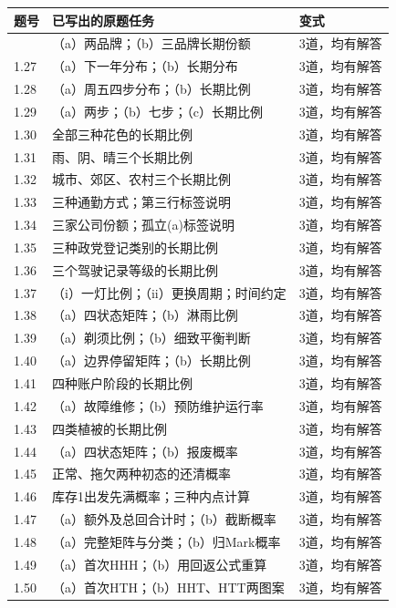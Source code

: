 \documentclass[
  11pt,
  a4paper,
  UTF8,
  fontset=fandol]{ctexart}
\begin{document}
\begin{longtable}[]{@{}lll@{}}
\toprule\noalign{}
题号 & 已写出的原题任务 & 变式 \\
\midrule\noalign{}
\endhead
\bottomrule\noalign{}
\endlastfoot
1.26 & （a）两品牌；（b）三品牌长期份额 & 3道，均有解答 \\
1.27 & （a）下一年分布；（b）长期分布 & 3道，均有解答 \\
1.28 & （a）周五四步分布；（b）长期比例 & 3道，均有解答 \\
1.29 & （a）两步；（b）七步；（c）长期比例 & 3道，均有解答 \\
1.30 & 全部三种花色的长期比例 & 3道，均有解答 \\
1.31 & 雨、阴、晴三个长期比例 & 3道，均有解答 \\
1.32 & 城市、郊区、农村三个长期比例 & 3道，均有解答 \\
1.33 & 三种通勤方式；第三行标签说明 & 3道，均有解答 \\
1.34 & 三家公司份额；孤立(a)标签说明 & 3道，均有解答 \\
1.35 & 三种政党登记类别的长期比例 & 3道，均有解答 \\
1.36 & 三个驾驶记录等级的长期比例 & 3道，均有解答 \\
1.37 & （i）一灯比例；（ii）更换周期；时间约定 & 3道，均有解答 \\
1.38 & （a）四状态矩阵；（b）淋雨比例 & 3道，均有解答 \\
1.39 & （a）剃须比例；（b）细致平衡判断 & 3道，均有解答 \\
1.40 & （a）边界停留矩阵；（b）长期比例 & 3道，均有解答 \\
1.41 & 四种账户阶段的长期比例 & 3道，均有解答 \\
1.42 & （a）故障维修；（b）预防维护运行率 & 3道，均有解答 \\
1.43 & 四类植被的长期比例 & 3道，均有解答 \\
1.44 & （a）四状态矩阵；（b）报废概率 & 3道，均有解答 \\
1.45 & 正常、拖欠两种初态的还清概率 & 3道，均有解答 \\
1.46 & 库存1出发先满概率；三种内点计算 & 3道，均有解答 \\
1.47 & （a）额外及总回合计时；（b）截断概率 & 3道，均有解答 \\
1.48 & （a）完整矩阵与分类；（b）归Mark概率 & 3道，均有解答 \\
1.49 & （a）首次HHH；（b）用回返公式重算 & 3道，均有解答 \\
1.50 & （a）首次HTH；（b）HHT、HTT两图案 & 3道，均有解答 \\

\end{longtable}
\end{document}
